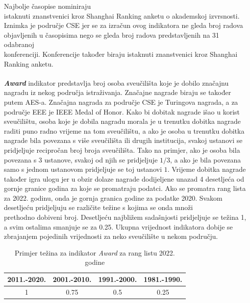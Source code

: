 \documentclass[times, utf8, zavrsni]{fer}
\begin{document}
Najbolje časopise nominiraju \\istaknuti znanstvenici kroz Shanghai Ranking anketu o akademskoj izvrsnosti. \\Iznimka je područje CSE 
jer se za izračun ovog indikatora ne gleda broj radova \\objavljenih u časopisima nego se gleda broj radova predstavljenih na 31 odabranoj \\konferenciji.
Konferencije također biraju istaknuti znanstvenici kroz Shanghai \\Ranking anketu.
\\ \\\textbf{\emph{Award}} indikator predstavlja broj osoba sveučilišta koje je dobilo značajnu nagradu iz nekog područja istraživanja. Značajne nagrade 
biraju se također putem AES-a. Značajna nagrada za područje CSE je Turingova 
nagrada, a za područje EEE je IEEE Medal of Honor.
Kako bi dobitak nagrade išao u korist sveučilištu, osoba koje je dobila nagradu morala je u trenutku dobitka nagrade raditi puno radno vrijeme na 
tom sveučilištu, a ako  je osoba u trenutku dobitka nagrade bila povezana s više sveučilišta ili drugih institucija, svakoj ustanovi se pridjeljuje
recipročan broj broja sveučilišta. Tako na primjer, ako je osoba bila povezana s 3 ustanove, svakoj od njih se pridjeljuje $1/3$, a ako je bila 
povezana samo s jednom ustanovom pridjeljuje se toj ustanovi $1$. 
Vrijeme dobitka nagrade također igra ulogu jer u obzir dolaze nagrade dodijeljene unazad 4 desetljeća od gornje granice godina za koje se promatraju podatci.
Ako se promatra rang lista za 2022. godinu, onda je gornja granica godine za podatke 2020. Svakom desetljeću pridjeljuju se različite težine 
s kojima se onda množi \\prethodno dobiveni broj. Desetljeću najbližem sadašnjosti pridjeljuje se težina 1, a svim ostalima smanjuje se za 0.25.
Ukupna vrijednost indikatora dobije se zbrajanjem pojedinih vrijednosti za neko sveučilište u nekom području.

\begin{table}[htb]
    \caption{Primjer težina za indikator \emph{Award} za rang listu 2022. godine}
        \label{tbl:konstante2}
        \centering
        \begin{tabular}{cccc} \hline
        2011.-2020. & 2001.-2010. & 1991.-2000. & 1981.-1990.\\ \hline
        1&0.75&0.5&0.25\\
        \end{tabular}
        \end{table}    
        \FloatBarrier
\end{document}
